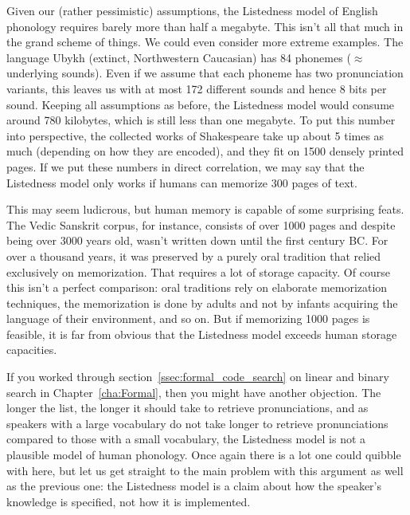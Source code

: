 Given our (rather pessimistic) assumptions, the Listedness model of English phonology requires barely more than half a megabyte.
This isn't all that much in the grand scheme of things.
We could even consider more extreme examples. 
The language Ubykh (extinct, Northwestern Caucasian) has 84 phonemes ($\approx$ underlying sounds).
Even if we assume that each phoneme has two pronunciation variants, this leaves us with at most 172 different sounds and hence 8 bits per sound.
Keeping all assumptions as before, the Listedness model would consume around 780 kilobytes, which is still less than one megabyte.
To put this number into perspective, the collected works of Shakespeare take up about 5 times as much (depending on how they are encoded), and they fit on 1500 densely printed pages.
If we put these numbers in direct correlation, we may say that the Listedness model only works if humans can memorize 300 pages of text.

This may seem ludicrous, but human memory is capable of some surprising feats.
The Vedic Sanskrit corpus, for instance, consists of over 1000 pages and despite being over 3000 years old, wasn't written down until the first century BC.
For over a thousand years, it was preserved by a purely oral tradition that relied exclusively on memorization.
That requires a lot of storage capacity.
Of course this isn't a perfect comparison: oral traditions rely on elaborate memorization techniques, the memorization is done by adults and not by infants acquiring the language of their environment, and so on.
But if memorizing 1000 pages is feasible, it is far from obvious that the Listedness model exceeds human storage capacities.

If you worked through section~\ref{ssec:formal_code_search} on linear and binary search in Chapter~\ref{cha:Formal}, then you might have another objection.
The longer the list, the longer it should take to retrieve pronunciations, and as speakers with a large vocabulary do not take longer to retrieve pronunciations compared to those with a small vocabulary, the Listedness model is not a plausible model of human phonology.
Once again there is a lot one could quibble with here, but let us get straight to the main problem with this argument as well as the previous one: the Listedness model is a claim about how the speaker's knowledge is specified, not how it is implemented. 

